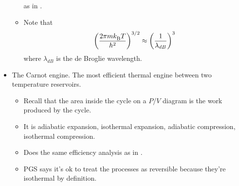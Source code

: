 \documentclass[../notes.tex]{subfiles}
\begin{document}
\begin{itemize}
\begin{itemize}
        as in \textcite{bib:McQuarrieSimon}.
        \item Note that
        \begin{equation*}
            \left( \frac{2\pi m{k_\text{B}^{}} T}{h^2} \right)^{3/2} \approx \left( \frac{1}{\lambda_{dB}} \right)^3
        \end{equation*}
        where $\lambda_{dB}$ is the de Broglie wavelength.
    \end{itemize}
    \item The Carnot engine. The most efficient thermal engine between two temperature reservoirs.
    \begin{itemize}
        \item Recall that the area inside the cycle on a $P$/$V$ diagram is the work produced by the cycle.
        \item It is adiabatic expansion, isothermal expansion, adiabatic compression, isothermal compression.
        \item Does the same efficiency analysis as in \textcite{bib:McQuarrieSimon}.
        \item PGS says it's ok to treat the processes as reversible because they're isothermal by definition.
    \end{itemize}
\end{itemize}
\end{document}
